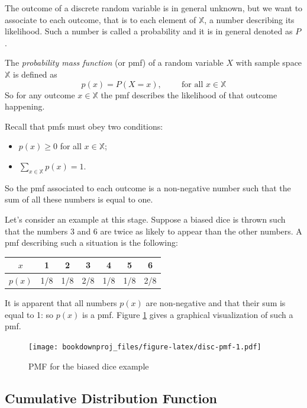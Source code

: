 \documentclass[
]{book}
\begin{document}
The outcome of a discrete random variable is in general unknown, but we want to associate to each outcome, that is to each element of \(\mathbb{X}\), a number describing its likelihood. Such a number is called a probability and it is in general denoted as \(P\).

The \emph{probability mass function} (or pmf) of a random variable \(X\) with sample space \(\mathbb{X}\) is defined as
\[
p(x)=P(X=x), \hspace{1cm} \mbox{for all } x\in\mathbb{X}
\]
So for any outcome \(x\in\mathbb{X}\) the pmf describes the likelihood of that outcome happening.

Recall that pmfs must obey two conditions:

\begin{itemize}
\item
  \(p(x)\geq 0\) for all \(x\in\mathbb{X}\);
\item
  \(\sum_{x\in\mathbb{X}}p(x)=1\).
\end{itemize}

So the pmf associated to each outcome is a non-negative number such that the sum of all these numbers is equal to one.

Let's consider an example at this stage. Suppose a biased dice is thrown such that the numbers 3 and 6 are twice as likely to appear than the other numbers. A pmf describing such a situation is the following:

\begin{longtable}[]{@{}ccccccc@{}}
\toprule
\(x\) & 1 & 2 & 3 & 4 & 5 & 6 \\
\midrule
\endhead
\(p(x)\) & 1/8 & 1/8 & 2/8 & 1/8 & 1/8 & 2/8 \\
\bottomrule
\end{longtable}

It is apparent that all numbers \(p(x)\) are non-negative and that their sum is equal to 1: so \(p(x)\) is a pmf. Figure \ref{fig:disc-pmf} gives a graphical visualization of such a pmf.

\begin{figure}
\centering
\texttt{[image: bookdownproj\_files/figure-latex/disc-pmf-1.pdf]}
\caption{\label{fig:disc-pmf}PMF for the biased dice example}
\end{figure}

\hypertarget{cumulative-distribution-function}{%
\subsection{Cumulative Distribution Function}\label{cumulative-distribution-function}}
\end{document}
